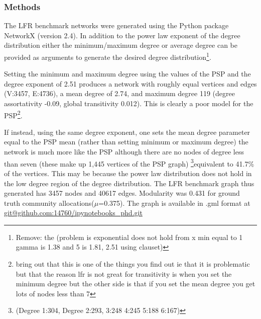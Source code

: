 





\subsubsection{Methods}
\label{sec:LFT methods}
The LFR benchmark networks were generated using the Python package NetworkX (version 2.4)\cite{hagberg2008exploring}. In addition to the power law exponent of the degree distribution either the minimum/maximum degree or average degree can be provided as arguments to generate the desired degree distribution\footnote{Remove: the (problem is exponential does not hold from x min equal to 1 gamma is 1.38 and 5 is 1.81, 2.51 using clauset)}.

Setting the minimum and maximum degree using the values of the PSP and the degree exponent of 2.51 produces a network with  roughly equal vertices and edges (V:3457, E:4736), a mean degree of 2.74, and maximum degree 119 (degree assortativity -0.09, global transitivity 0.012). This is clearly a poor model for the PSP\footnote{bring out that this is one of the things you find out ie that it is problematic but that the reason lfr is not great for transitivity is when you set the minimum degree but the other side is that if you set the mean degree you get lots of nodes less than 7}.

If instead, using the same degree exponent, one sets the mean degree parameter equal to the PSP mean (rather than setting minimum or maximum degree) the network is much more like the PSP although there are no nodes of degree less than seven (these make up 1,445 vertices of the PSP graph) \footnote{(Degree 1:304, Degree 2:293, 3:248 4:245 5:188 6:167)}equivalent to 41.7\% of the vertices.  This may be because the power law distribution does not hold in the low degree region of the degree distribution. The LFR benchmark graph thus generated has 3457 nodes and 40617 edges.
Modularity was 0.431 for ground truth community allocations($\mu$=0.375). The graph is available in .gml format at \url{git@github.com:14760/ipynotebooks_phd.git}

